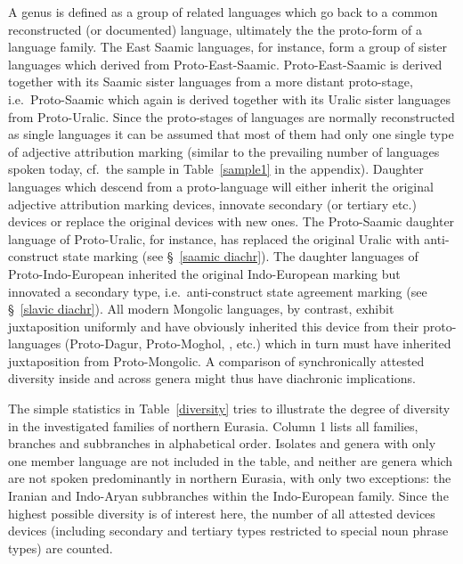 A genus is defined as a group of related languages which go back to a common reconstructed (or documented) language, ultimately the the proto-form of a language family. The East Saamic languages, for instance, form a group of sister languages which derived from Proto\hyp{}East-Saamic. Proto\hyp{}East-Saamic is derived together with its Saamic sister languages from a more distant proto-stage, i.e.~Proto\hyp{}Saamic which again is derived together with its Uralic sister languages from Proto\hyp{}Uralic. Since the proto-stages of languages are normally reconstructed as single languages it can be assumed that most of them had only one single type of adjective attribution marking (similar to the prevailing number of languages spoken today, cf.~the sample in Table~\ref{sample1} in the appendix). Daughter languages which descend from a proto-language will either inherit the original adjective attribution marking devices, innovate secondary (or tertiary etc.) devices or replace the original devices with new ones. The Proto\hyp{}Saamic daughter language of Proto\hyp{}Uralic, for instance, has replaced the original Uralic  with anti\hyp{}construct state marking (see \S~\ref{saamic diachr}). The  daughter languages of Proto\hyp{}Indo-European inherited the original Indo-European  marking but innovated a secondary type, i.e.~anti\hyp{}construct state agreement marking (see \S~\ref{slavic diachr}). All modern Mongolic languages, by contrast, exhibit juxtaposition uniformly and have obviously inherited this device from their proto-languages (Proto\hyp{}Dagur, Proto\hyp{}Moghol, , etc.) which in turn must have inherited juxtaposition from Proto\hyp{}Mongolic. A comparison of synchronically attested diversity inside and across genera might thus have diachronic implications.

The simple statistics in Table~\ref{diversity} tries to illustrate the degree of diversity in the investigated families of northern Eurasia. Column 1 lists all families, branches and subbranches in alphabetical order. Isolates and genera with only one member language are not included in the table, and neither are genera which are not spoken predominantly in northern Eurasia, with only two exceptions: the Iranian and Indo-Aryan subbranches within the Indo-European family. Since the highest possible diversity is of interest here, the number of all attested devices devices (including secondary and tertiary types restricted to special noun phrase types) are counted. 

